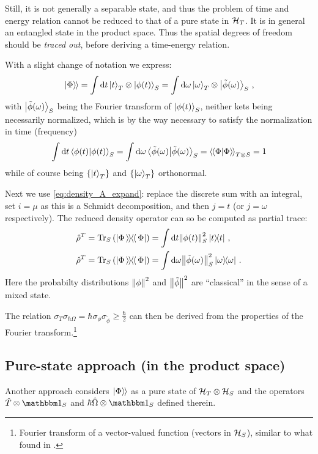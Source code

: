 Still, it is not generally
a separable state,
and thus
the problem of time and energy relation cannot be reduced to that of
a pure state in $\mathcal{H}_T$.
It is in general an entangled state in the product space.
Thus the spatial degrees of freedom should be \emph{traced out},
before deriving a time-energy relation.

With a slight change of notation we express:
\begin{equation}
  \left.\left| \Phi \right\rangle\hspace{-0.115em}\right\rangle =
    \int \dd{t} \ket{t}_T \otimes \ket{\phi(t)}_S =
    \int \dd\omega \ket{\omega}_T \otimes \ket{\tilde{\phi}(\omega)}_S \, \text{,}
\end{equation}
with $\ket{\tilde{\phi}(\omega)}_S$ being the Fourier transform
of $\ket{\phi(t)}_S$,
neither kets being necessarily normalized, which is by the way necessary
to satisfy the normalization in time (frequency)
\[
  \int \dd{t} \braket{\phi(t)}_S =
    \int \dd{\omega} \braket{\tilde{\phi}(\omega)}_S =
    \left\langle\hspace{-0.115em}\left\langle \Phi \middle| \Phi \right\rangle\hspace{-0.115em}\right\rangle_{T \otimes S} = 
    1
\]
while of course being $\left\{\ket{t}_T\right\}$ and $\left\{\ket{\omega}_T\right\}$
orthonormal.

Next we use \eqref{eq:density_A_expand}: replace the discrete sum with an integral,
set $i = \mu$ as this is a Schmidt decomposition, and then $j = t$
(or $j = \omega$ respectively).
The reduced density operator can so be computed
as partial trace:
\begin{align}
  \hat{\rho}^T = \Tr_S\qty(\left| \Phi \left\rangle\hspace{-0.115em}\left\rangle \hspace{-0.115em} \right\langle\hspace{-0.115em}\right\langle \Phi \right|) &= \int \dd t \norm{\phi(t)}^2_S \ketbra{t}{t}
    \, \text{,}
  \\ 
  \hat{\rho}^T = \Tr_S\qty(\left| \Phi \left\rangle\hspace{-0.115em}\left\rangle \hspace{-0.115em} \right\langle\hspace{-0.115em}\right\langle \Phi \right|) &= \int \dd \omega \norm{\tilde{\phi}(\omega)}^2_S \ketbra{\omega}{\omega}
    \,\text{.} 
\end{align}
Here the probabilty distributions $\norm{\phi}^2$ and $\norm{\tilde{\phi}}^2$
are ``classical'' in the sense of a mixed state.

The relation $\sigma_T\sigma_{\hbar\Omega} = \hbar \sigma_{\phi} \sigma_{\tilde{\phi}} \geq \frac{\hbar}{2}$
can then be derived from the properties of the Fourier transform.\footnote{
  Fourier transform of a
  vector-valued function
  (vectors in $\mathcal{H}_S$),
  similar to what found in \cite{Maccone:Pauli}.
}

\subsection{Pure-state approach (in the product space)}

Another approach considers $\left.\left| \Phi \right\rangle\hspace{-0.115em}\right\rangle$ as a pure state of $\mathcal{H}_T \otimes \mathcal{H}_S$
and the operators $\hat{T} \ox \idop_{S}$ and $\hbar\hat{\Omega} \ox \idop_{S}$
defined therein.

